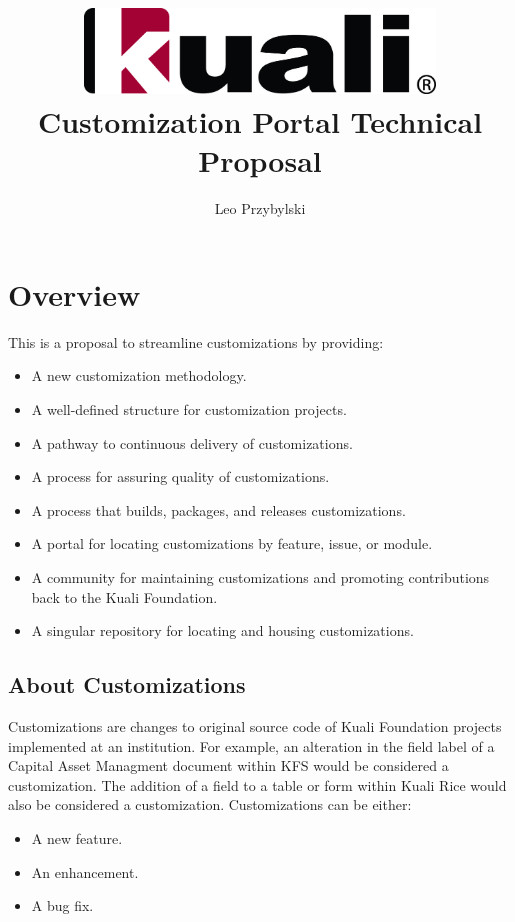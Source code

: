 \documentclass[12pt]{report}
\author{Leo Przybylski}
\title{\includegraphics[width=0.70\textwidth]{../images/kuali_base.png}\\Customization Portal Technical Proposal}
\begin{document}
\maketitle
\tableofcontents


\section{Overview}

This is a proposal to streamline customizations by providing:
\begin{itemize}
  \item A new customization methodology.
  \item A well-defined structure for customization projects.
  \item A pathway to continuous delivery of customizations.
  \item A process for assuring quality of customizations.
  \item A process that builds, packages, and releases customizations.
  \item A portal for locating customizations by feature, issue, or module.
  \item A community for maintaining customizations and promoting contributions back to the Kuali Foundation.
  \item A singular repository for locating and housing customizations.
\end{itemize}

\subsection{About Customizations}

Customizations are changes to original source code of Kuali Foundation projects implemented at an institution. For example, an
alteration in the field label of a Capital Asset Managment document within KFS would be considered a customization. The addition of
a field to a table or form within Kuali Rice would also be considered a customization. Customizations can be either:
\begin{itemize}
  \item A new feature.
  \item An enhancement.
  \item A bug fix.
\end{itemize}
\end{document}
